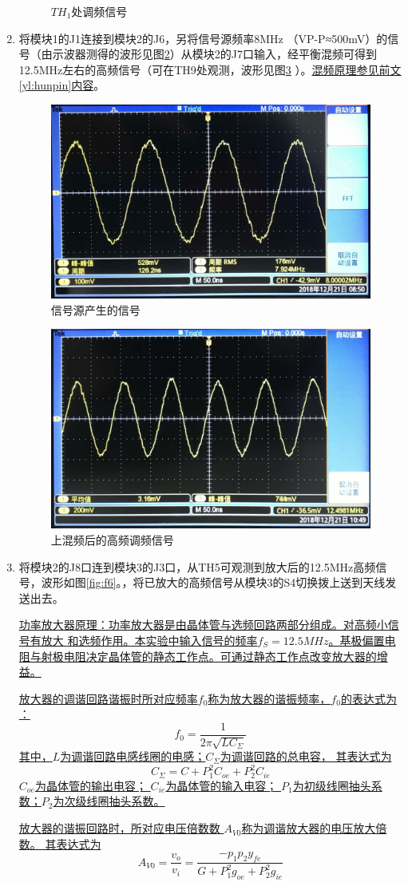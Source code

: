\documentclass[12pt]{article}%
\numberwithin{equation}{section}
\begin{document}
\begin{enumerate}[1.]
\begin{figure}[htbp]
  \caption{$TH_1$处调频信号 } 
  \label{fig:f3} 
\end{figure}
\item 将模块1的J1连接到模块2的J6，另将信号源频率8MHz （VP-P≈500mV）的信号（由示波器测得的波形见图\ref{fig:f4}）从模块2的J7口输入，经平衡混频可得到12.5MHz左右的高频信号（可在TH9处观测，波形见图\ref{fig:f5} ）。\uline{混频原理参见前文\ref{yl:hunpin}内容}。
 \begin{figure}[htbp]
  \centering
  \includegraphics[width=.45\textwidth]{gaopin6/gaopin611.jpg}
  \caption{信号源产生的信号 } 
  \label{fig:f4} 
\end{figure}
 \begin{figure}[htbp]
  \centering
  \includegraphics[width=.45\textwidth]{gaopin6/gaopin606.jpg}
  \caption{上混频后的高频调频信号 } 
  \label{fig:f5} 
\end{figure}
\item\label{yl:gf} 将模块2的J8口连到模块3的J3口，从TH5可观测到放大后的12.5MHz高频信号，波形如图\ref{fig:f6}。，将已放大的高频信号从模块3的S4切换拨上送到天线发送出去。\par\uline{功率放大器原理：功率放大器是由晶体管与选频回路两部分组成。对高频小信号有放大 和选频作用。本实验中输入信号的频率$f_S=12.5MHz$。基极偏置电阻与射极电阻决定晶体管的静态工作点。可通过静态工作点改变放大器的增益。}\par\uline{放大器的调谐回路谐振时所对应频率$f_0$称为放大器的谐振频率，$f_0$的表达式为 ：}
\begin{equation}
f_0=\frac{1}{2\pi\sqrt{LC_{\Sigma }}}
\end{equation}\uline{其中，$L$为调谐回路电感线圈的电感；$C_{\Sigma}$为调谐回路的总电容， 其表达式为 }\begin{equation}
C_{\Sigma}=C+P_1^2C_{oe}+P_2^2C_{ie}
\end{equation}\uline{$C_{oe}$为晶体管的输出电容； $C_{ie}$为晶体管的输入电容； $P_1$为初级线圈抽头系数；$ P_2$为次级线圈抽头系数。}\par\uline{放大器的谐振回路时，所对应电压倍数数 $A_{V0}$称为调谐放大器的电压放大倍数。 其表达式为}\begin{equation}
A_{V0}=\frac{v_o}{v_i}=\frac{-p_1p_2y_{fe}}{G+P_1^2g_{oe}+P_2^2g_{ie}}
\end{equation}


\end{enumerate}
\end{document}
